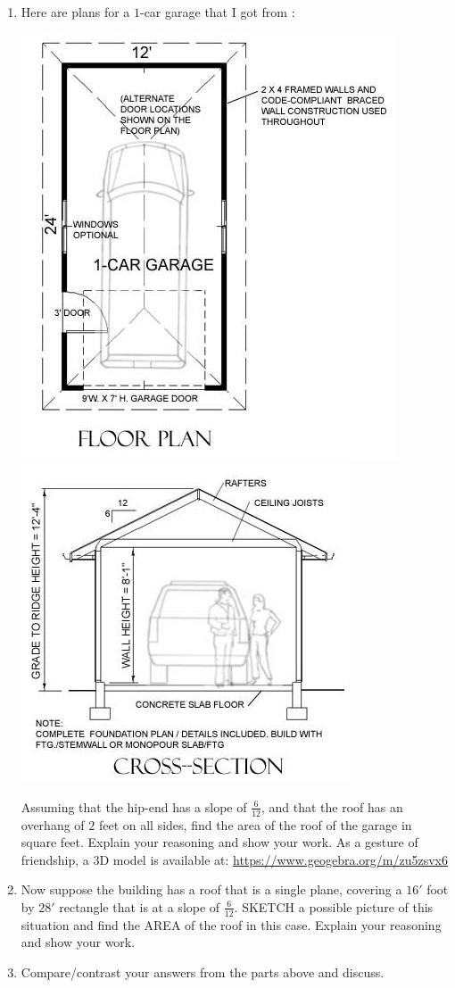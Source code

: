 \documentclass[hints,nooutcomes,noauthor,handout]{ximera}
\begin{document}
 \begin{question}
\begin{enumerate}
\item Here are plans for a $1$-car garage that I got from :
   \begin{center}
     \includegraphics[width=.4\textwidth]{oneCarGarage.jpeg}
    \includegraphics[width=.35\textwidth]{oneCarGarageFront.jpeg}
   \end{center}
   Assuming that the hip-end has a slope of $\tfrac{6}{12}$, and that
   the roof has an overhang of $2$ feet on all sides, find the area of
   the roof of the garage in square feet.  Explain your reasoning and
   show your work. As a gesture of friendship, a 3D model is available
   at: \url{https://www.geogebra.org/m/zu5zsvx6}
 \item Now suppose the building has a roof that is a single plane,
   covering a $16'$ foot by $28'$ rectangle that is at a slope of
   $\tfrac{6}{12}$. SKETCH a possible picture of this situation and
   find the AREA of the roof in this case. Explain your reasoning and
   show your work.
\item Compare/contrast your answers from the parts above and discuss. 
   
\end{enumerate}


\end{question}
\end{document}
